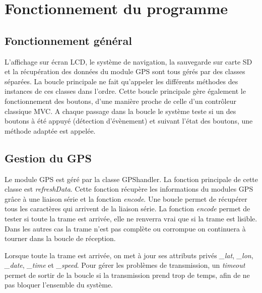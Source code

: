 \documentclass[a4paper,12pt,titlepage]{article}
\begin{document}
\section{Fonctionnement du programme}

\subsection{Fonctionnement général}

L'affichage sur écran LCD, le système de navigation, la sauvegarde sur carte SD
et la récupération des données du module GPS sont tous gérés par des classes
séparées. La boucle principale ne fait qu'appeler les différents méthodes des
instances de ces classes dans l'ordre. Cette boucle principale gère également
le fonctionnement des boutons, d'une manière proche de celle d'un contrôleur
classique MVC. A chaque passage dans la boucle le système teste si un des
boutons à été appuyé (détection d'évènement) et suivant l'état des boutons, une
méthode adaptée est appelée.

\subsection{Gestion du GPS}

Le module GPS est géré par la classe GPShandler. La fonction principale de
cette classe est \emph{refreshData}. Cette fonction récupère les informations
du modules GPS grâce à une liaison série et la fonction \emph{encode}. Une
boucle permet de récupérer tous les caractères qui arrivent de la liaison série.
La fonction \emph{encode} permet de tester si toute la trame est arrivée, elle
ne renverra vrai que si la trame est lisible. Dans les autres cas la trame
n'est pas complète ou corrompue on continuera à tourner dans la boucle de
réception.

Lorsque toute la trame est arrivée, on met à jour ses attributs privés
\emph{\_lat}, \emph{\_lon}, \emph{\_date}, \emph{\_time} et \emph{\_speed}.
Pour gérer les problèmes de transmission, un \emph{timeout} permet de sortir
de la boucle si la transmission prend trop de temps, afin de ne pas bloquer
l'ensemble du système.
\end{document}

